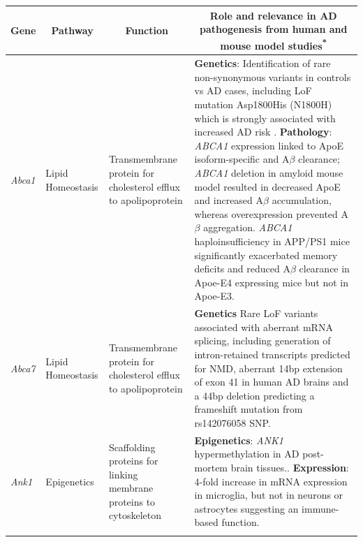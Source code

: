 \begin{landscape}
\begin{longtable}[c]{p{1cm}p{2cm}p{4cm}p{19cm}}
			\toprule
			\multicolumn{1}{c}{Gene} &
			\multicolumn{1}{c}{Pathway} &
			\multicolumn{1}{c}{Function} &
			\multicolumn{1}{c}{Role and relevance in AD pathogenesis from human and mouse model studies\textsuperscript{*}} \\* \midrule
			\endfirsthead	%
			\endhead%
			\bottomrule
			\endfoot%
			\endlastfoot%
			\centering \textit{Abca1} &
			\centering Lipid Homeostasis  &
			\centering Transmembrane protein for cholesterol efflux to apolipoprotein \newline &
			\tabitem\textbf{Genetics}: Identification of rare non-synonymous variants in controls vs AD cases, including LoF mutation Asp1800His (N1800H) which is strongly associated with increased AD risk \cite{Nordestgaard2015}. \newline
			\tabitem \textbf{Pathology}: \textit{ABCA1} expression linked to ApoE isoform-specific and A$\beta$ clearance; \textit{ABCA1} deletion in amyloid mouse model resulted in decreased ApoE and increased A$\beta$ accumulation, whereas overexpression prevented A$\beta$ aggregation\cite{Koldamova2014}. \textit{ABCA1} haploinsufficiency in APP/PS1 mice significantly exacerbated memory deficits and reduced A$\beta$ clearance in Apoe-E4 expressing mice but not in Apoe-E3\cite{Fitz2012}.\ \\
			\hdashline[0.5pt/5pt]
			
			\centering \textit{Abca7} &
			\centering Lipid Homeostasis  &
			\centering Transmembrane protein for cholesterol efflux to apolipoprotein  &
			\tabitem \textbf{Genetics} Rare LoF variants associated with aberrant mRNA splicing, including generation of intron-retained transcripts predicted for NMD\cite{Steinberg2015,Cuyvers2015,Guennec2016},  aberrant 14bp extension of exon 41 in human AD brains\cite{Steinberg2015,Grear2009} and a 44bp deletion predicting a frameshift mutation from rs142076058 SNP. \cite{Cukier2016} \\
			\hdashline[0.5pt/5pt]
			
			\centering \textit{Ank1} &
			\centering Epigenetics  &
			\centering Scaffolding proteins for linking membrane proteins to cytoskeleton &
			\tabitem \textbf{Epigenetics}: \textit{ANK1} hypermethylation in AD post-mortem brain tissues.\cite{Smith2019, Lunnon2014}. \newline 
			\tabitem \textbf{Expression}: 4-fold increase in mRNA expression in microglia, but not in neurons or astrocytes suggesting an immune-based function. \cite{Mastroeni2017}  \\
			\hdashline[0.5pt/5pt]
			

\end{longtable}
\end{landscape}
